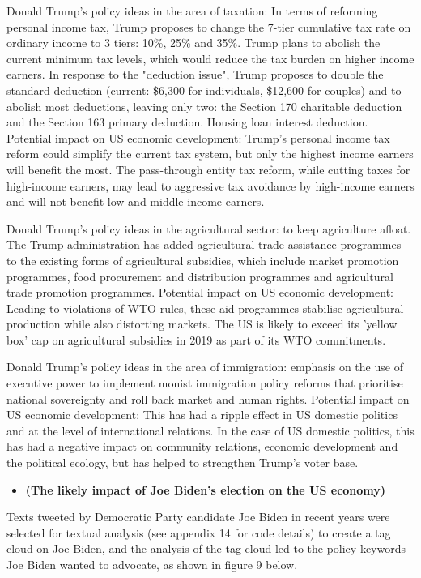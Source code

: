 \documentclass{apmcmthesis}
\begin{document}
Donald Trump's policy ideas in the area of taxation: In terms of reforming personal income tax, Trump proposes to change the 7-tier cumulative tax rate on ordinary income to 3 tiers: 10\%, 25\% and 35\%. Trump plans to abolish the current minimum tax levels, which would reduce the tax burden on higher income earners. In response to the "deduction issue", Trump proposes to double the standard deduction (current: \$6,300 for individuals, \$12,600 for couples) and to abolish most deductions, leaving only two: the Section 170 charitable deduction and the Section 163 primary deduction. Housing loan interest deduction. Potential impact on US economic development: Trump's personal income tax reform could simplify the current tax system, but only the highest income earners will benefit the most. The pass-through entity tax reform, while cutting taxes for high-income earners, may lead to aggressive tax avoidance by high-income earners and will not benefit low and middle-income earners.

Donald Trump's policy ideas in the agricultural sector: to keep agriculture afloat. The Trump administration has added agricultural trade assistance programmes to the existing forms of agricultural subsidies, which include market promotion programmes, food procurement and distribution programmes and agricultural trade promotion programmes. Potential impact on US economic development: Leading to violations of WTO rules, these aid programmes stabilise agricultural production while also distorting markets. The US is likely to exceed its 'yellow box' cap on agricultural subsidies in 2019 as part of its WTO commitments.

Donald Trump's policy ideas in the area of immigration: emphasis on the use of executive power to implement monist immigration policy reforms that prioritise national sovereignty and roll back market and human rights. Potential impact on US economic development: This has had a ripple effect in US domestic politics and at the level of international relations. In the case of US domestic politics, this has had a negative impact on community relations, economic development and the political ecology, but has helped to strengthen Trump's voter base.
\begin{itemize}
\item \textbf{(The likely impact of Joe Biden's election on the US economy)}
\end{itemize}
Texts tweeted by Democratic Party candidate Joe Biden in recent years were selected for textual analysis (see appendix 14 for code details) to create a tag cloud on Joe Biden, and the analysis of the tag cloud led to the policy keywords Joe Biden wanted to advocate, as shown in figure 9 below.
\end{document}
